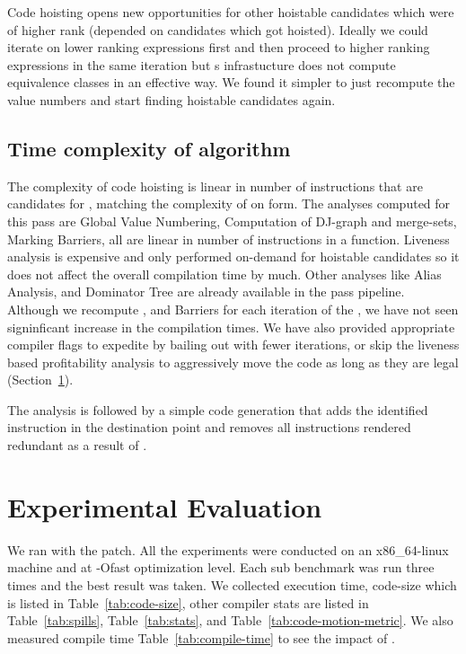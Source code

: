 \documentclass[acmlarge,review,anonymous]{acmart}\settopmatter{printfolios=true}
\begin{document}
Code hoisting opens new opportunities for other hoistable candidates which were
of higher rank (depended on candidates which got hoisted). Ideally we could
iterate on lower ranking expressions first and then proceed to higher ranking
expressions in the same iteration but s \GVN{} infrastucture does not
compute equivalence classes in an effective way. We found it simpler to just
recompute the value numbers and start finding hoistable candidates again.

\subsection{Time complexity of algorithm}
The complexity of code hoisting is linear in number of instructions that are
candidates for \gcm{}, matching the complexity of \PRE{} on \SSA{} form.
The analyses computed for this pass are Global Value Numbering, Computation of
DJ-graph and merge-sets, Marking Barriers, all are linear in number of
instructions in a function. Liveness analysis is expensive and only performed
on-demand for hoistable candidates so it does not affect the overall compilation
time by much. Other analyses like Alias Analysis, \MemorySSA{} and Dominator Tree
are already available in the \LLVM{} pass pipeline. Although we recompute \GVN{}, and
Barriers for each iteration of the \gcm{}, we have not seen signinficant
increase in the compilation times. We have also provided appropriate compiler
flags to expedite \gcm{} by bailing out with fewer iterations, or skip the
liveness based profitability analysis to aggressively move the code as long as
they are legal (Section~\ref{sec:experimental-results}).

The analysis is followed by a simple code generation that adds the identified
instruction in the destination point and removes all instructions rendered
redundant as a result of \gcm{}.


\section{Experimental Evaluation}
\label{sec:experimental-results}
We ran \SPEC{} with the patch. All the experiments were conducted on an
x86\_64-linux machine and at -Ofast optimization level. Each sub benchmark was
run three times and the best result was taken. We collected execution time,
code-size which is listed in Table~\ref{tab:code-size}, other compiler stats are
listed in Table~\ref{tab:spills}, Table~\ref{tab:stats}, and
Table~\ref{tab:code-motion-metric}.  We also measured compile time
Table~\ref{tab:compile-time} to see the impact of \gcm{}.
\end{document}
